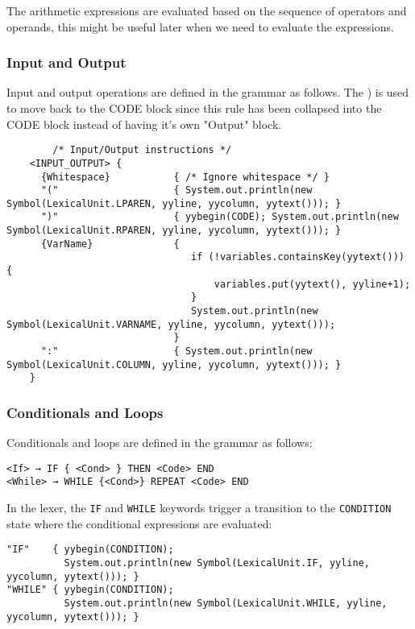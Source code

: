 \documentclass{article}
\begin{document}
	The arithmetic expressions are evaluated based on the sequence of operators and operands, this might be useful later when we need to evaluate the expressions.\\

	\subsubsection{Input and Output}
	Input and output operations are defined in the grammar as follows.
	The ) is used to move back to the CODE block since this rule has been collapsed into the CODE block instead of having it's own "Output" block.\\
	\begin{verbatim}
		/* Input/Output instructions */
	<INPUT_OUTPUT> {
	  {Whitespace}           { /* Ignore whitespace */ }
	  "("                    { System.out.println(new Symbol(LexicalUnit.LPAREN, yyline, yycolumn, yytext())); }
	  ")"                    { yybegin(CODE); System.out.println(new Symbol(LexicalUnit.RPAREN, yyline, yycolumn, yytext())); }
	  {VarName}              {
								if (!variables.containsKey(yytext())) {
									variables.put(yytext(), yyline+1);
								}
								System.out.println(new Symbol(LexicalUnit.VARNAME, yyline, yycolumn, yytext()));
							 }
	  ":"                    { System.out.println(new Symbol(LexicalUnit.COLUMN, yyline, yycolumn, yytext())); }
	}
	\end{verbatim}

	\subsubsection{Conditionals and Loops}
	Conditionals and loops are defined in the grammar as follows:

	\begin{verbatim}
<If> → IF { <Cond> } THEN <Code> END
<While> → WHILE {<Cond>} REPEAT <Code> END
	\end{verbatim}

	In the lexer, the \texttt{IF} and \texttt{WHILE} keywords trigger a transition to the \texttt{CONDITION} state where the conditional expressions are evaluated:

	\begin{verbatim}
"IF"    { yybegin(CONDITION);
          System.out.println(new Symbol(LexicalUnit.IF, yyline, yycolumn, yytext())); }
"WHILE" { yybegin(CONDITION);
          System.out.println(new Symbol(LexicalUnit.WHILE, yyline, yycolumn, yytext())); }
	\end{verbatim}
\end{document}
